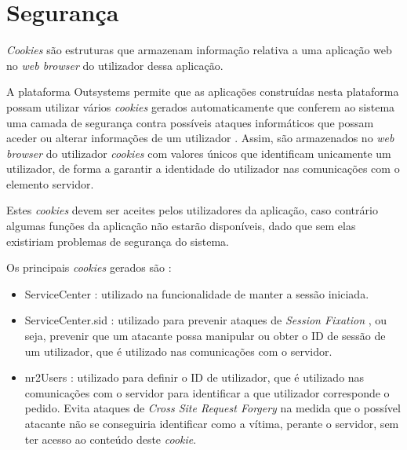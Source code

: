 \section{Segurança} \label{seg}
\textit{Cookies} são estruturas que armazenam informação relativa a uma aplicação web no \textit{web browser} do utilizador dessa aplicação.\par
A plataforma Outsystems permite que as aplicações construídas nesta plataforma possam utilizar vários \textit{cookies} gerados automaticamente que conferem ao sistema uma camada de segurança contra possíveis ataques informáticos que possam aceder ou alterar informações de um utilizador \cite{cookies}. Assim, são armazenados no \textit{web browser} do utilizador \textit{cookies} com valores únicos que identificam unicamente um utilizador, de forma a garantir a identidade do utilizador nas comunicações com o elemento servidor.\par
Estes \textit{cookies} devem ser aceites pelos utilizadores da aplicação, caso contrário algumas funções da aplicação não estarão disponíveis, dado que sem elas existiriam problemas de segurança do sistema.\par
Os principais \textit{cookies} gerados são :
\begin{itemize}
\item ServiceCenter : utilizado na funcionalidade de manter a sessão iniciada.
\item ServiceCenter.sid : utilizado para prevenir ataques de \textit{Session Fixation} \cite{sessfix}, ou seja, prevenir que um atacante possa manipular ou obter o ID de sessão de um utilizador, que é utilizado nas comunicações com o servidor.
\item nr2Users : utilizado para definir o ID de utilizador, que é utilizado nas comunicações com o servidor para identificar a que utilizador corresponde o pedido. Evita ataques de \textit{Cross Site Request Forgery} \cite{crsf} na medida que o possível atacante não se conseguiria identificar como a vítima, perante o servidor, sem ter acesso ao conteúdo deste \textit{cookie}. 
\end{itemize}



















